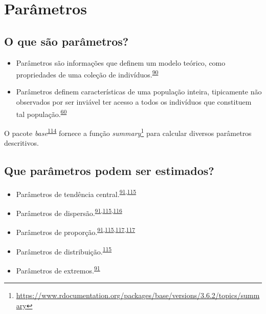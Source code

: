 \documentclass[
  a4paper,
]{book}
\renewcommand{\href}[2]{#2\footnote{\url{#1}}}
\newenvironment{infobox}[1]
  {
  \begin{itemize}
  \renewcommand{\labelitemi}{
    \raisebox{-.7\height}[0pt][0pt]{
      {\setkeys{Gin}{width=3em,keepaspectratio}
        \texttt{[image: \#1]}}
    }
  }
  \setlength{\fboxsep}{1em}
  \begin{blackbox}
  \item
  }
  {
  \end{blackbox}
  \end{itemize}
  }
\begin{document}
\hypertarget{parametros}{%
\section{Parâmetros}\label{parametros}}

\hypertarget{o-que-suxe3o-paruxe2metros}{%
\subsection{O que são parâmetros?}\label{o-que-suxe3o-paruxe2metros}}

\begin{itemize}
\item
  Parâmetros são informações que definem um modelo teórico, como propriedades de uma coleção de indivíduos.\textsuperscript{\protect\hyperlink{ref-Altman1999}{90}}
\item
  Parâmetros definem características de uma população inteira, tipicamente não observados por ser inviável ter acesso a todos os indivíduos que constituem tal população.\textsuperscript{\protect\hyperlink{ref-vetter2017}{60}}
\end{itemize}

\begin{infobox}{images/Rlogo}
O pacote \emph{base}\textsuperscript{\protect\hyperlink{ref-base-6}{114}} fornece a função \href{https://www.rdocumentation.org/packages/base/versions/3.6.2/topics/summary}{\emph{summary}} para calcular diversos parâmetros descritivos.

\end{infobox}

\hypertarget{que-paruxe2metros-podem-ser-estimados}{%
\subsection{Que parâmetros podem ser estimados?}\label{que-paruxe2metros-podem-ser-estimados}}

\begin{itemize}
\item
  Parâmetros de tendência central.\textsuperscript{\protect\hyperlink{ref-Ali2016}{91},\protect\hyperlink{ref-kanji2006}{115}}
\item
  Parâmetros de dispersão.\textsuperscript{\protect\hyperlink{ref-Ali2016}{91},\protect\hyperlink{ref-kanji2006}{115},\protect\hyperlink{ref-Curran-Everett2008}{116}}
\item
  Parâmetros de proporção.\textsuperscript{\protect\hyperlink{ref-Ali2016}{91},\protect\hyperlink{ref-kanji2006}{115},\protect\hyperlink{ref-Altman1994}{117},\protect\hyperlink{ref-Altman1994}{117}}
\item
  Parâmetros de distribuição.\textsuperscript{\protect\hyperlink{ref-kanji2006}{115}}
\item
  Parâmetros de extremos.\textsuperscript{\protect\hyperlink{ref-Ali2016}{91}}
\end{itemize}
\end{document}

